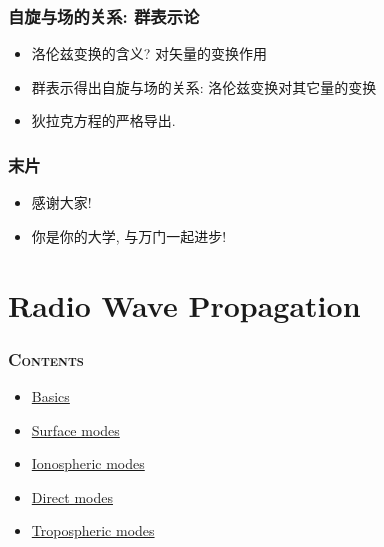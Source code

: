 \documentclass[aspectratio=169, 10pt, utf8, mathserif]{beamer}
\def\hilite<#1>{\temporal<#1>{\color{blue!80}}{\color{blue!85!white}}{\color{black}}}%
\numberwithin{equation}{section} %
\numberwithin{figure}{section} %
\begin{document}
\begin{frame}
\frametitle{\textsc{自旋与场的关系: 群表示论}}
\begin{itemize}
\hilite<1>\item 洛伦兹变换的含义? 对矢量的变换作用\pause
\hilite<2>\item 群表示得出自旋与场的关系: 洛伦兹变换对其它量的变换\pause
\hilite<3>\item 狄拉克方程的严格导出.
\end{itemize}
\end{frame}


\begin{frame}
\frametitle{\textsc{末片}}
\begin{itemize}
\hilite<1>\item 感谢大家!\pause
\hilite<2>\item 你是你的大学, 与万门一起进步!

\end{itemize}
\end{frame}


\section[Radio Wave Propagation 电波传播]{Radio Wave Propagation}


\begin{frame}%
    \frametitle{\textsc{Contents}} \vspace{-0.85cm}\label{sec:6}
    \begin{multicols}{2}
    \begin{minipage}[t]{0.55\textwidth}
    \end{minipage}

    \begin{minipage}[t]{0.55\textwidth}
    \vspace{3.3cm}
    \begin{spacing}{1.2} %
    \begin{itemize}
        \item\hyperlink{subsec:6-1}{Basics}
        \item\hyperlink{subsec:6-2}{Surface modes}
        \item\hyperlink{subsec:6-3}{Ionospheric modes}
        \item\hyperlink{subsec:6-4}{Direct modes}
        \item\hyperlink{subsec:6-5}{Tropospheric modes}
    \end{itemize}
    \end{spacing}
    \end{minipage}
    \end{multicols}
\end{frame}
\end{document}
